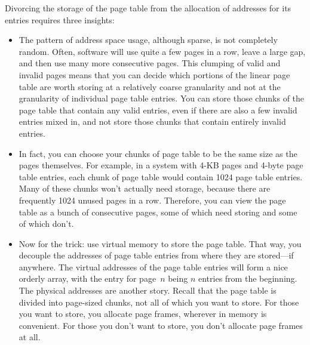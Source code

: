 Divorcing the storage of the page table from the allocation of addresses for its entries requires three insights:
\begin{itemize}
\item
The pattern of address space usage, although sparse, is not completely
random.  Often, software will use quite a few pages in a row,
leave a large gap, and then use many more consecutive pages.  This
clumping of valid and invalid pages means that you can decide which
portions of the linear page table are worth storing at a relatively
coarse granularity and not at the granularity of individual page table
entries.  You can store those chunks of the page table that contain any
valid entries, even if there are also a few invalid entries mixed in,
and not store those chunks that contain entirely invalid entries.
\item
In fact, you can choose your chunks of page table to be the same size as
the pages themselves.  For example, in a system with 4-KB pages and
4-byte page table entries, each chunk of page table would contain
1024 page table entries.  Many of these chunks won't actually need
storage, because there are frequently 1024 unused pages in a row.  Therefore,
you can view the page table as a bunch of
consecutive pages, some of which need storing and some of which don't.
\item
Now for the trick: use virtual memory to store the page table. That
way, you decouple the addresses of page table entries from where they
are stored---if anywhere.  The virtual addresses of the page table
entries will form a nice orderly array, with the entry for page~$n$
being $n$ entries from the beginning.  The physical addresses are
another story.  Recall that the page table is divided into page-sized
chunks, not all of which you want to store.  For those you want to
store, you allocate page frames, wherever in memory is convenient.  For
those you don't want to store, you don't allocate page frames at all.
\end{itemize}

